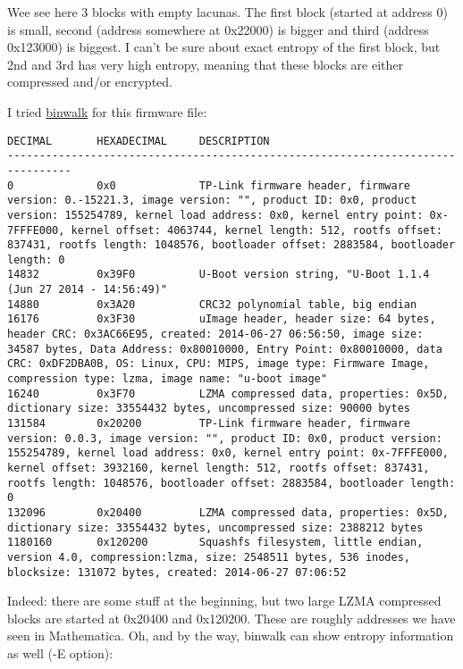 Wee see here 3 blocks with empty lacunas.
The first block (started at address 0) is small, second (address somewhere at 0x22000) is bigger and third (address 0x123000) is biggest.
I can't be sure about exact entropy of the first block, but 2nd and 3rd has very high entropy, meaning that these blocks are either
compressed and/or encrypted.

I tried \href{http://binwalk.org/}{binwalk} for this firmware file:

\begin{lstlisting}
DECIMAL       HEXADECIMAL     DESCRIPTION
--------------------------------------------------------------------------------
0             0x0             TP-Link firmware header, firmware version: 0.-15221.3, image version: "", product ID: 0x0, product version: 155254789, kernel load address: 0x0, kernel entry point: 0x-7FFFE000, kernel offset: 4063744, kernel length: 512, rootfs offset: 837431, rootfs length: 1048576, bootloader offset: 2883584, bootloader length: 0
14832         0x39F0          U-Boot version string, "U-Boot 1.1.4 (Jun 27 2014 - 14:56:49)"
14880         0x3A20          CRC32 polynomial table, big endian
16176         0x3F30          uImage header, header size: 64 bytes, header CRC: 0x3AC66E95, created: 2014-06-27 06:56:50, image size: 34587 bytes, Data Address: 0x80010000, Entry Point: 0x80010000, data CRC: 0xDF2DBA0B, OS: Linux, CPU: MIPS, image type: Firmware Image, compression type: lzma, image name: "u-boot image"
16240         0x3F70          LZMA compressed data, properties: 0x5D, dictionary size: 33554432 bytes, uncompressed size: 90000 bytes
131584        0x20200         TP-Link firmware header, firmware version: 0.0.3, image version: "", product ID: 0x0, product version: 155254789, kernel load address: 0x0, kernel entry point: 0x-7FFFE000, kernel offset: 3932160, kernel length: 512, rootfs offset: 837431, rootfs length: 1048576, bootloader offset: 2883584, bootloader length: 0
132096        0x20400         LZMA compressed data, properties: 0x5D, dictionary size: 33554432 bytes, uncompressed size: 2388212 bytes
1180160       0x120200        Squashfs filesystem, little endian, version 4.0, compression:lzma, size: 2548511 bytes, 536 inodes, blocksize: 131072 bytes, created: 2014-06-27 07:06:52
\end{lstlisting}

Indeed: there are some stuff at the beginning, but two large LZMA compressed blocks are started at 0x20400 and 0x120200.
These are roughly addresses we have seen in Mathematica.
Oh, and by the way, binwalk can show entropy information as well (-E option):

